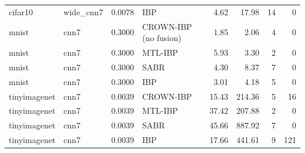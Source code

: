\begin{tabular}{llllrrrr}
cifar10 & wide_cnn7 & 0.0078 & IBP & 4.62 & 17.98 & 14 & 0 \\
mnist & cnn7 & 0.3000 & CROWN-IBP (no fusion) & 1.85 & 2.06 & 4 & 0 \\
mnist & cnn7 & 0.3000 & MTL-IBP & 5.93 & 3.30 & 2 & 0 \\
mnist & cnn7 & 0.3000 & SABR & 4.30 & 8.37 & 7 & 0 \\
mnist & cnn7 & 0.3000 & IBP & 3.01 & 4.18 & 5 & 0 \\
tinyimagenet & cnn7 & 0.0039 & CROWN-IBP & 15.43 & 214.36 & 5 & 16 \\
tinyimagenet & cnn7 & 0.0039 & MTL-IBP & 37.42 & 207.88 & 2 & 0 \\
tinyimagenet & cnn7 & 0.0039 & SABR & 45.66 & 887.92 & 7 & 0 \\
tinyimagenet & cnn7 & 0.0039 & IBP & 17.66 & 441.61 & 9 & 121 \\
\bottomrule
\end{tabular}
